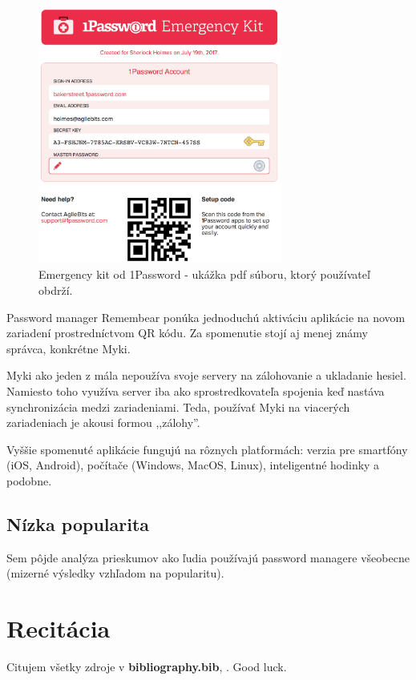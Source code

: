 \begin{figure}[ht]
  \centering
  \includegraphics[width=8cm]{img/1pass.png}
  \caption{Emergency kit od 1Password - ukážka pdf súboru, ktorý používateľ obdrží.}
\end{figure}

\par Password manager Remembear ponúka jednoduchú aktiváciu aplikácie na novom zariadení prostredníctvom QR kódu. Za spomenutie stojí aj menej známy správca, konkrétne Myki. \par Myki ako jeden z mála nepoužíva svoje servery na zálohovanie a ukladanie hesiel. Namiesto toho využíva server iba ako sprostredkovateľa \cite{18} spojenia keď nastáva synchronizácia medzi zariadeniami. Teda, používať Myki na viacerých zariadeniach je akousi formou ,,zálohy''.
\par Vyššie spomenuté aplikácie fungujú na rôznych platformách: verzia pre smartfóny (iOS, Android), počítače (Windows, MacOS, Linux), inteligentné hodinky a podobne.

\subsection{Nízka popularita}
Sem pôjde analýza prieskumov ako ľudia používajú password managere všeobecne (mizerné výsledky vzhľadom na popularitu).

\section{Recitácia}
Citujem všetky zdroje v \textbf{bibliography.bib}, \cite{t00, t01, t02, t03, kniha, kniha2, kniha3, small, big, cs, koll, kap, tug, knuth, zbornik, prispevok}. \newline Good luck.
